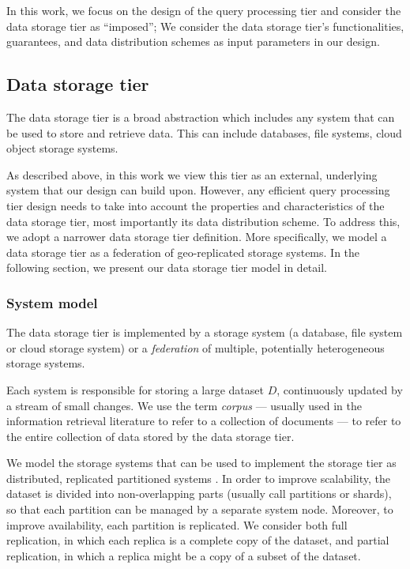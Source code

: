 \medskip
\noindent
In this work, we focus on the design of the query processing tier and consider the data storage tier as ``imposed'';
We consider the data storage tier's functionalities, guarantees, and data distribution schemes as input parameters in
our design.


\subsection{Data storage tier}

The data storage tier is a broad abstraction which includes any system that can be used to store and retrieve data.
This can include databases, file systems, cloud object storage systems.

As described above, in this work we view this tier as an external, underlying system that our design can build upon.
However, any efficient query processing tier design needs to take into account the properties and characteristics of the
data storage tier, most importantly its data distribution scheme.
To address this, we adopt a narrower data storage tier definition.
More specifically, we model a data storage tier as a federation of geo-replicated storage systems.
In the following section, we present our data storage tier model in detail.


\subsubsection{System model}
The data storage tier is implemented by a storage system (a database, file system or cloud storage system) or a
\textit{federation} of multiple, potentially heterogeneous storage systems.

Each system is responsible for storing a large dataset $D$, continuously updated by a stream of small changes.
We use the term \textit{corpus}  --- usually used in the information retrieval literature to refer to a collection of documents ---
to refer to the entire collection of data stored by the data storage tier.

We model the storage systems that can be used to implement the storage tier as distributed, replicated partitioned systems \cite{agrawal:taxonomy}.
In order to improve scalability, the dataset is divided into non-overlapping parts (usually call partitions or shards),
so that each partition can be managed by a separate system node.
Moreover, to improve availability, each partition is replicated.
We consider both full replication, in which each replica is a complete copy of the dataset,
and partial replication, in which a replica might be a copy of a subset of the dataset.

